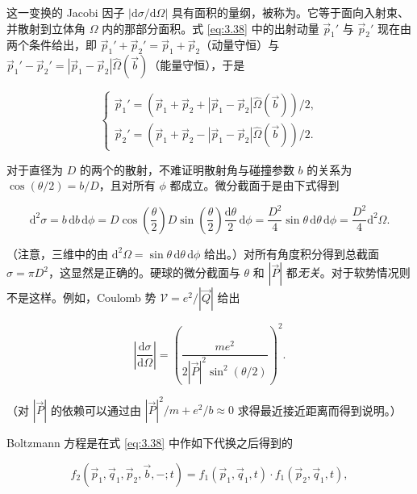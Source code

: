 这一变换的 Jacobi 因子 $|\mathrm{d}\sigma/\mathrm{d}\Omega|$ 具有面积的量纲，被称为。它等于面向入射束、并散射到立体角 $\Omega$ 内的那部分面积。式 \eqref{eq:3.38} 中的出射动量 $\vec p_1'$ 与 $\vec p_2'$ 现在由两个条件给出，即 $\vec p_1'+\vec p_2'=\vec p_1+\vec p_2$（动量守恒）与 $\vec p_1'-\vec p_2'=|\vec p_1-\vec p_2|\hat\Omega(\vec b)$（能量守恒），于是

\begin{equation}\label{eq:3.39}
  \begin{cases}
    \vec p_1'=\left(\vec p_1+\vec p_2+|\vec p_1-\vec p_2|\hat\Omega(\vec b)\right)/2,\\[4pt]
    \vec p_2'=\left(\vec p_1+\vec p_2-|\vec p_1-\vec p_2|\hat\Omega(\vec b)\right)/2.
  \end{cases}
\end{equation}

对于直径为 $D$ 的两个的散射，不难证明散射角与碰撞参数 $b$ 的关系为 $\cos(\theta/2)=b/D$，且对所有 $\phi$ 都成立。微分截面于是由下式得到

\begin{equation*}
  \mathrm{d}^2\sigma=b\,\mathrm{d}b\,\mathrm{d}\phi=D\cos\left(\frac{\theta}{2}\right)D\sin\left(\frac{\theta}{2}\right)\frac{\mathrm{d}\theta}{2}\,\mathrm{d}\phi=\frac{D^2}{4}\sin\theta\,\mathrm{d}\theta\,\mathrm{d}\phi=\frac{D^2}{4}\mathrm{d}^2\Omega .
\end{equation*}

（注意，三维中的由 $\mathrm{d}^2\Omega=\sin\theta\,\mathrm{d}\theta\,\mathrm{d}\phi$ 给出。）对所有角度积分得到总截面 $\sigma=\pi D^2$，这显然是正确的。硬球的微分截面与 $\theta$ 和 $|\vec P|$ 都\emph{无关}。对于软势情况则不是这样。例如，Coulomb 势 $\mathscr V=e^2/|\vec Q|$ 给出

\begin{equation*}
  \left|\frac{\mathrm{d}\sigma}{\mathrm{d}\Omega}\right|=\left(\frac{me^2}{2|\vec P|^2\sin^2(\theta/2)}\right)^2 .
\end{equation*}


（对 $|\vec P|$ 的依赖可以通过由 $|\vec P|^2/m+e^2/b\approx 0$ 求得最近接近距离而得到说明。）

Boltzmann 方程是在式 \eqref{eq:3.38} 中作如下代换之后得到的

\begin{equation}\label{eq:3.40}
  f_2(\vec p_1,\vec q_1,\vec p_2,\vec b,-;t)=f_1(\vec p_1,\vec q_1,t)\cdot f_1(\vec p_2,\vec q_1,t),
\end{equation}

